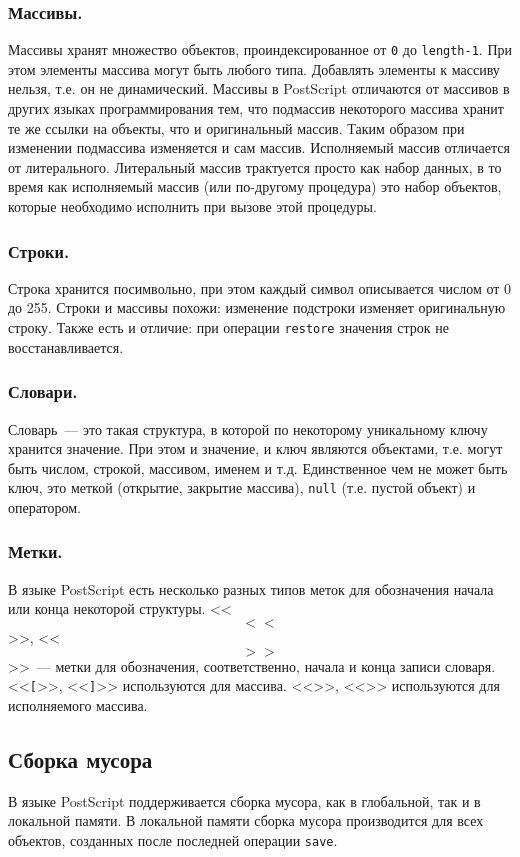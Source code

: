 \subsubsection*{Массивы.}
Массивы хранят множество объектов, проиндексированное от \texttt{0} до \texttt{length-1}. При этом элементы массива могут быть любого типа. Добавлять элементы к массиву нельзя, т.е. он не динамический. Массивы в PostScript отличаются от массивов в других языках программирования тем, что подмассив некоторого массива хранит те же ссылки на объекты, что и оригинальный массив. Таким образом при изменении подмассива изменяется и сам массив. Исполняемый массив отличается от литерального.  Литеральный массив трактуется просто как набор данных, в то время как исполняемый массив (или по-другому процедура) это набор объектов, которые необходимо исполнить при вызове этой процедуры.

\subsubsection*{Строки.}
Строка хранится посимвольно, при этом каждый символ описывается числом от 0 до 255. Строки и массивы похожи: изменение подстроки изменяет оригинальную строку. Также есть и отличие: при операции \texttt{restore} значения строк не восстанавливается.

\subsubsection*{Словари.}
Словарь~--- это такая структура, в которой по некоторому уникальному ключу хранится значение. При этом и значение, и ключ являются объектами, т.е. могут быть числом, строкой, массивом, именем и т.д. Единственное чем не может быть ключ, это меткой (открытие, закрытие массива), \texttt{null} (т.е. пустой объект) и оператором.

\subsubsection*{Метки.}
В языке PostScript есть несколько разных типов меток для обозначения начала или конца некоторой структуры. <<$$<<$$>>, <<$$>>$$>>~--- метки для обозначения, соответственно, начала и конца записи словаря. <<\texttt{[}>>, <<\texttt{]}>> используются для массива. <<\texttt{\textbraceleft}>>, <<\texttt{\textbraceright}>> используются для исполняемого массива.
\subsection{Сборка мусора}
В языке PostScript поддерживается сборка мусора, как в глобальной, так и в локальной памяти. В локальной памяти сборка мусора производится для всех объектов, созданных после последней операции \texttt{save}.

